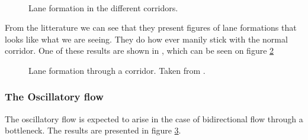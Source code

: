 \begin{figure}[h]
\centering
\subfloat[]{\resizebox{8cm}{!}{}}
\subfloat[]{\resizebox{8cm}{!}{}}\\
\subfloat[]{\resizebox{8cm}{!}{}}
\caption{Lane formation in the different corridors.}
\label{fig:laneformation}
\end{figure}

From the litterature we can see that they present figures of lane formations
 that looks like what we are seeing. They do how ever manily stick with the normal corridor. One of these results are shown in \cite{lanes}, which can be seen on figure \ref{fig:laneformation_litterature}
\begin{figure}[h]
\centering
\subfloat[]{\resizebox{8cm}{!}{}}
\caption{Lane formation through a corridor. Taken from \cite{lanes}.}
\label{fig:laneformation_litterature}
\end{figure}
 


\subsubsection{The Oscillatory flow}
The oscillatory flow is expected to arise in the case of bidirectional
flow through a bottleneck. The results are presented in figure
\ref{fig:oscillitoryflow}.\\

\begin{figure}[h]
\centering
{}
\caption{}
\label{fig:oscillitoryflow}
\end{figure}

